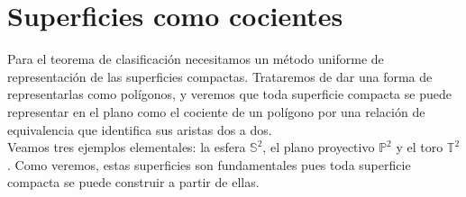 \documentclass[10pt]{report}
\newcommand{\Esfera}{\mathbb{S}^2}
\newcommand{\Toro}{\mathbb{T}^2}
\newcommand{\Proyectivo}{\mathbb{P}^2}
\theoremstyle{definition}
\begin{document}
\section{Superficies como cocientes}

Para el teorema de clasificación necesitamos un método uniforme de representación de las superficies compactas. Trataremos de dar una forma de representarlas como polígonos, y veremos que toda superficie compacta se puede representar en el plano como el cociente de un polígono por una relación de equivalencia que identifica sus aristas dos a dos.\\
Veamos tres ejemplos elementales: la esfera $\Esfera$, el plano proyectivo $\Proyectivo$ y el toro $\Toro$. Como veremos, estas superficies son fundamentales pues toda superficie compacta se puede construir a partir de ellas. 
\end{document}
